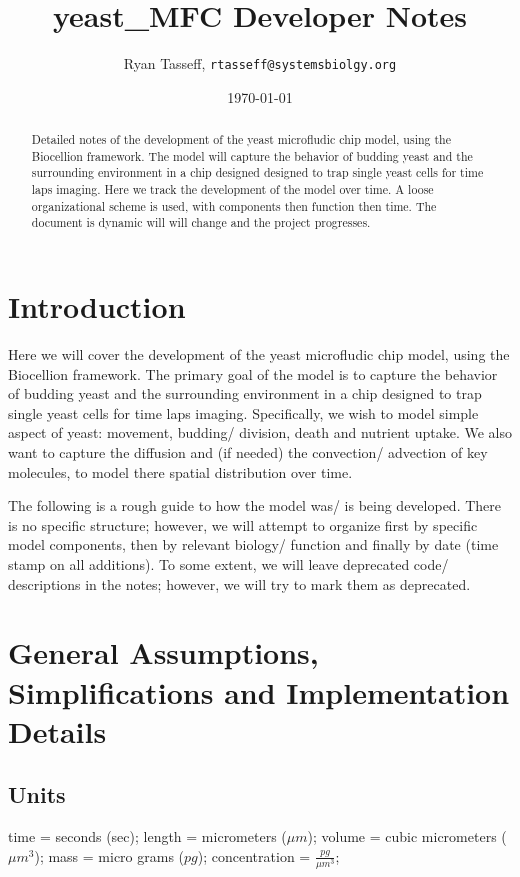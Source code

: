 \documentclass{article}
\title{yeast\_MFC Developer Notes} %
\author{Ryan Tasseff, \texttt{rtasseff@systemsbiolgy.org}}  %
\date{\today}  %
\begin{document}
\maketitle


\begin{abstract}
Detailed notes of the development of the yeast microfludic chip model,
using the Biocellion framework.
The model will capture the behavior of 
budding yeast and the surrounding environment in a chip designed 
designed to trap single yeast cells for time laps imaging.
Here we track the development of the model over time.
A loose organizational scheme is used, with components then function then time.
The document is dynamic will will change and the project progresses. \end{abstract}
 
\section{Introduction}
Here we will cover the development of the yeast microfludic chip model,
using the Biocellion framework.
The primary goal of the model is to capture the behavior of 
budding yeast and the surrounding environment in a chip  
designed to trap single yeast cells for time laps imaging.
Specifically, we wish to model simple aspect of yeast: 
movement, budding/ division, death and nutrient uptake.
We also want to capture the diffusion and (if needed) the 
convection/ advection of key molecules, 
to model there spatial distribution over time.

The following is a rough guide to how the model was/ is being developed.
There is no specific structure; however, 
we will attempt to organize first by specific model components, 
then by relevant biology/ function and finally by date (time stamp on all additions).
To some extent, we will leave deprecated code/ descriptions
in the notes; however, we will try to mark them as deprecated.

\section{General Assumptions, Simplifications and Implementation Details}
\subsection{Units}
time = seconds (sec);
length = micrometers ($\mu m$);
volume = cubic micrometers ($\mu m^3$);
mass = micro grams ($pg$);
concentration = $\frac{pg}{\mu m^3}$;
\end{document}
